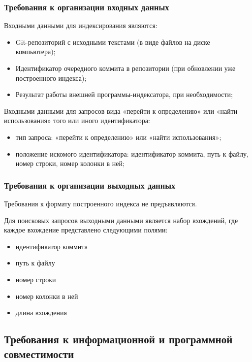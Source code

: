     \subsubsection{Требования к организации входных данных}
        Входными данными для индексирования являются:
    	\begin{itemize}
    	    \item Git-репозиторий с исходными текстами (в виде файлов на диске компьютера);
    	    \item Идентификатор очередного коммита в репозитории (при обновлении уже построенного индекса);
    	    \item Результат работы внешней программы-индексатора, при необходимости;
    	\end{itemize}
    	
    	Входными данными для запросов вида «перейти к определению» или «найти использования» того или иного идентификатора:
    	\begin{itemize}
    	    \item тип запроса: «перейти к определению» или «найти использования»;
    	    \item положение искомого идентификатора: идентификатор коммита, путь к файлу, номер строки, номер колонки в ней;
    	\end{itemize}
    
    \subsubsection{Требования к организации выходных данных}
    	Требования к формату построенного индекса не предъявляются.
    	
    	Для поисковых запросов выходными данными является набор вхождений, где каждое вхождение представлено следующими полями:
    	\begin{itemize}
    	    \item идентификатор коммита
    	    \item путь к файлу
    	    \item номер строки
    	    \item номер колонки в ней
    	    \item длина вхождения
    	\end{itemize}
    	
\subsection{Требования к информационной и программной совместимости}
